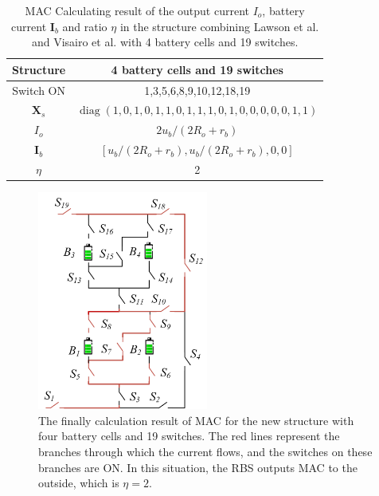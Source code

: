 \documentclass{article}
\DeclareMathOperator{\diag}{diag}
\begin{document}
\begin{table}[htbp]
  \centering
    \caption{MAC Calculating result of the output current $I_o$, battery current $\bm{I}_b$ and ratio $\eta$ in the structure combining Lawson et al.\cite{lawsonSoftwareConfigurableBattery2012} and Visairo et al.\cite{visairoReconfigurableBatteryPack2008} with 4 battery cells and 19 switches.} %
    \begin{tabular}{cc}
    \toprule
        Structure & 4 battery cells and 19 switches  \\
    \midrule
    Switch ON & 1,3,5,6,8,9,10,12,18,19 \\
    $\bm{X}_s$ & $\diag(1,0,1,0,1,1,0,1,1,1,0,1,0,0,0,0,0,1,1)$ \\
    \midrule
        $I_o$ & $2u_b/(2R_o+r_b)$ \\
        $\bm{I}_b$ & $[u_b/(2R_o+r_b),u_b/(2R_o+r_b),0,0]$ \\
        $\eta$     & 2 \\
    \bottomrule
    \end{tabular}%
  \label{tab:find_mac}%
\end{table}%

\begin{figure}[htbp]
    \centering
    \includegraphics[width=0.5\textwidth]{../attachments/ef-mac.png}
    \caption{
        The finally calculation result of MAC for the new structure with four battery cells and 19 switches.
        The red lines represent the branches through which the current flows, and the switches on these branches are ON. 
        In this situation, the RBS outputs MAC to the outside, which is $\eta=2$.
    }\label{fig:ef-mac}
\end{figure}
\end{document}

